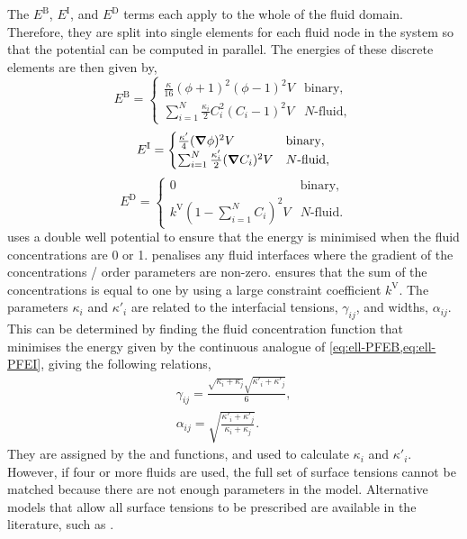 The $E^\text{B}$, $E^\text{I}$, and $E^\text{D}$ terms each apply to the whole of the fluid domain.
Therefore, they are split into single elements for each fluid node in the system so that the potential can be computed in parallel.
The energies of these discrete elements are then given by,
\begin{equation}
  E^\text{B} =
  \begin{cases}
    \frac{\kappa}{16} (\phi + 1)^2 (\phi - 1)^2 V & \text{binary},\\
    \sum_{i=1}^{N} \frac{\kappa_i}{2} C_i^2 (C_i - 1)^2 V & \text{$N$-fluid},
  \end{cases}
  \label{eq:ell-PFEB}
\end{equation}
\begin{equation}
  E^\text{I} =
  \begin{cases}
    \frac{\kappa'}{4} (\bm{\nabla} \phi)^2 V & \text{binary},\\
    \sum_{i=1}^{N} \frac{\kappa'_i}{2} (\bm{\nabla} C_i)^2 V & \text{$N$-fluid},
  \end{cases}
  \label{eq:ell-PFEI}
\end{equation}
\begin{equation}
  E^\text{D} =
  \begin{cases}
    0 & \text{binary},\\
    k^\text{V} \left( 1 - \sum_{i=1}^{N} C_i \right)^2 V & \text{$N$-fluid}.
  \end{cases}
  \label{eq:ell-PFED}
\end{equation}
 uses a double well potential to ensure that the energy is minimised when the fluid concentrations are 0 or 1.
 penalises any fluid interfaces where the gradient of the concentrations / order parameters are non-zero.
 ensures that the sum of the concentrations is equal to one by using a large constraint coefficient $k^\text{V}$.
The parameters $\kappa_i$ and $\kappa'_i$ are related to the interfacial tensions, $\gamma_{ij}$, and widths, $\alpha_{ij}$.
This can be determined by finding the fluid concentration function that minimises the energy given by the continuous analogue of \cref{eq:ell-PFEB,eq:ell-PFEI}, giving the following relations,
\begin{gather}
  \gamma_{ij} = \frac{\sqrt{\kappa_i+\kappa_j} \sqrt{\kappa'_i+\kappa'_j}}{6},\\
  \alpha_{ij} = \sqrt{\frac{\kappa'_i+\kappa'_j}{\kappa_i+\kappa_j}}.
\end{gather}
They are assigned by the  and  functions, and used to calculate $\kappa_i$ and $\kappa'_i$.
However, if four or more fluids are used, the full set of surface tensions cannot be matched because there are not enough parameters in the model.
Alternative models that allow all surface tensions to be prescribed are available in the literature, such as \cite{Dong2018}.

